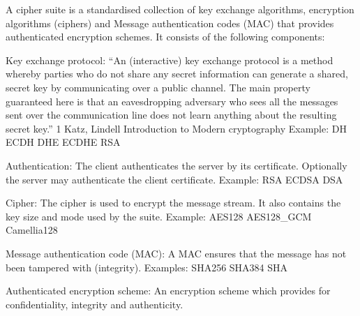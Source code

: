 
A cipher suite is a standardised collection of key exchange algorithms, encryption 
algorithms (ciphers) and Message authentication codes (MAC) that provides authenticated 
encryption schemes. It consists of the following components:

\begin{description}
\item{Key exchange protocol:}
``An (interactive) key exchange protocol is a method whereby parties who do not 
share any secret information can generate a shared, secret key by communicating 
over a public channel. The main property guaranteed here is that an 
eavesdropping adversary who sees all the messages sent over the communication 
line does not learn anything about the resulting secret key.'' {1} 
Katz, Lindell Introduction to Modern cryptography
Example: DH ECDH DHE ECDHE RSA

\item{Authentication:}
The client authenticates the server by its certificate. Optionally the server 
may authenticate the client certificate.
Example: RSA ECDSA DSA

\item{Cipher:}
The cipher is used to encrypt the message stream. It also contains the key size
and mode used by the suite.
Example: AES128 AES128\_GCM Camellia128

\item{Message authentication code (MAC):}
A MAC ensures that the message has not been tampered with (integrity).
Examples: SHA256 SHA384 SHA


\item{Authenticated encryption scheme:}
An encryption scheme which provides for confidentiality, integrity and authenticity.

\end{description}
